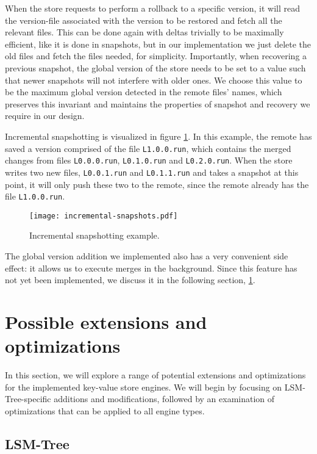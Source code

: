 When the store requests to perform a rollback to a specific version, it will read the version-file associated with the version to be restored and fetch all the relevant files. This can be done again with deltas trivially to be maximally efficient, like it is done in snapshots, but in our implementation we just delete the old files and fetch the files needed, for simplicity. Importantly, when recovering a previous snapshot, the global version of the store needs to be set to a value such that newer snapshots will not interfere with older ones. We choose this value to be the maximum global version detected in the remote files' names, which preserves this invariant and maintains the properties of snapshot and recovery we require in our design.

Incremental snapshotting is visualized in figure \ref{fig:incremental-snapshots}. In this example, the remote has saved a version comprised of the file \verb|L1.0.0.run|, which contains the merged changes from files \verb|L0.0.0.run|, \verb|L0.1.0.run| and \verb|L0.2.0.run|. When the store writes two new files, \verb|L0.0.1.run| and \verb|L0.1.1.run| and takes a snapshot at this point, it will only push these two to the remote, since the remote already has the file \verb|L1.0.0.run|.

\begin{figure}[h]
    \centering
    \texttt{[image: incremental-snapshots.pdf]}
    \caption{Incremental snapshotting example.}
    \label{fig:incremental-snapshots}
\end{figure}

The global version addition we implemented also has a very convenient side effect: it allows us to execute merges in the background. Since this feature has not yet been implemented, we discuss it in the following section, \ref{section-extensions}.

\section{Possible extensions and optimizations}
\label{section-extensions}

In this section, we will explore a range of potential extensions and optimizations for the implemented key-value store engines. We will begin by focusing on LSM-Tree-specific additions and modifications, followed by an examination of optimizations that can be applied to all engine types.

\subsection{LSM-Tree}

